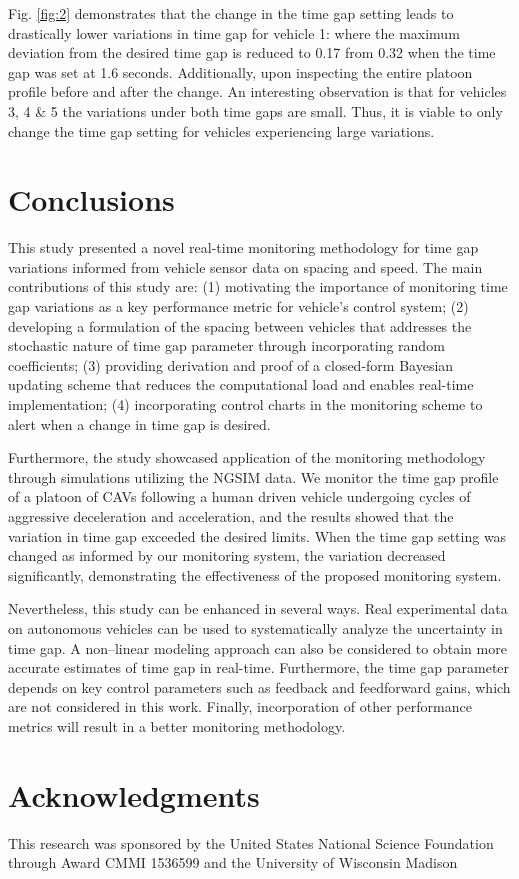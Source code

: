 \documentclass{article}
\begin{document}
Fig. \ref{fig:2} demonstrates that the change in the time gap setting leads to drastically lower variations in time gap for vehicle 1: where the maximum deviation from the desired time gap is reduced to 0.17 from 0.32 when the time gap was set at 1.6 seconds. Additionally, upon inspecting the entire platoon profile before and after the change. An interesting observation is that for vehicles 3, 4 \& 5 the variations under both time gaps are small. Thus, it is viable to only change the time gap setting for vehicles experiencing large variations. 


\section{Conclusions}

This study presented a novel real-time monitoring methodology for time gap variations informed from vehicle sensor data on spacing and speed. The main contributions of this study are: (1) motivating the importance of monitoring time gap variations as a key performance metric for vehicle’s control system; (2) developing a formulation of the spacing between vehicles that addresses the stochastic nature of time gap parameter through incorporating random coefficients; (3) providing derivation and proof of a closed-form Bayesian updating scheme that reduces the computational load and enables real-time implementation; (4) incorporating control charts in the monitoring scheme to alert when a change in time gap is desired. 

Furthermore, the study showcased application of the monitoring methodology through simulations utilizing the NGSIM data. We monitor the time gap profile of a platoon of CAVs following a human driven vehicle undergoing cycles of aggressive deceleration and acceleration, and the results showed that the variation in time gap exceeded the desired limits. When the time gap setting was changed as informed by our monitoring system, the variation decreased significantly, demonstrating the effectiveness of the proposed monitoring system.  

Nevertheless, this study can be enhanced in several ways. Real experimental data on autonomous vehicles can be used to systematically analyze the uncertainty in time gap. A non–linear modeling approach can also be considered to obtain more accurate estimates of time gap in real-time. Furthermore, the time gap parameter depends on key control parameters such as feedback and feedforward gains, which are not considered in this work. Finally, incorporation of other performance metrics will result in a better monitoring methodology.

\section*{Acknowledgments}
This research was sponsored by the United States National Science Foundation through Award CMMI 1536599 and the University of Wisconsin Madison


  
  
\end{document}

